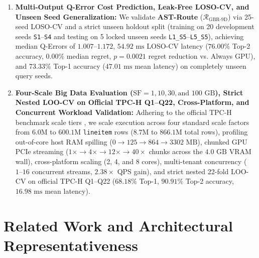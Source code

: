 \documentclass[10pt,a4paper]{article}
\begin{document}
\begin{enumerate}[leftmargin=1.5em,itemsep=2pt]
    \item \textbf{Multi-Output Q-Error Cost Prediction, Leak-Free LOSO-CV, and Unseen Seed Generalization:} We validate \textbf{AST-Route} ($\mathcal{R}_{\text{GBR-9D}}$) via 25-seed LOSO-CV and a strict unseen holdout split (training on 20 development seeds \texttt{S1}--\texttt{S4} and testing on 5 locked unseen seeds \texttt{L1\_S5}--\texttt{L5\_S5}), achieving median Q-Errors of $1.007\text{--}1.172$, $54.92\text{ ms}$ LOSO-CV latency ($76.00\%$ Top-2 accuracy, $0.00\%$ median regret, $p=0.0021$ regret reduction vs. Always GPU), and $73.33\%$ Top-1 accuracy ($47.01\text{ ms}$ mean latency) on completely unseen query seeds.
    \item \textbf{Four-Scale Big Data Evaluation ($\text{SF}=1, 10, 30, \text{and } 100\text{ GB}$), Strict Nested LOO-CV on Official TPC-H Q1--Q22, Cross-Platform, and Concurrent Workload Validation:} Adhering to the official TPC-H benchmark scale tiers \cite{tpc2022tpch,dreseler2020quantifying}, we scale execution across four standard scale factors from $6.0\text{M}$ to $600.1\text{M}$ \texttt{lineitem} rows ($8.7\text{M}$ to $866.1\text{M}$ total rows), profiling out-of-core host RAM spilling ($0 \rightarrow 125 \rightarrow 864 \rightarrow 3302\text{ MB}$), chunked GPU PCIe streaming ($1\times \rightarrow 4\times \rightarrow 12\times \rightarrow 40\times$ chunks across the $4.0\text{ GB}$ VRAM wall), cross-platform scaling (2, 4, and 8 cores), multi-tenant concurrency ($1\text{--}16$ concurrent streams, $2.38\times$ QPS gain), and strict nested 22-fold LOO-CV on official TPC-H Q1--Q22 ($68.18\%$ Top-1, $90.91\%$ Top-2 accuracy, $16.98\text{ ms}$ mean latency).
\end{enumerate}

\section{Related Work and Architectural Representativeness}
\end{document}
